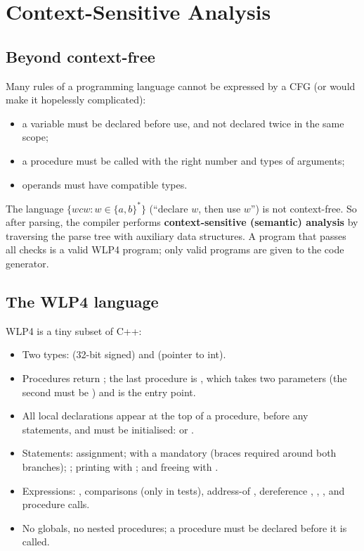 \chapter{Context-Sensitive Analysis}

\section{Beyond context-free}

Many rules of a programming language cannot be expressed by a CFG (or would make it
hopelessly complicated):
\begin{itemize}
  \item a variable must be declared before use, and not declared twice in the same scope;
  \item a procedure must be called with the right number and types of arguments;
  \item operands must have compatible types.
\end{itemize}
The language $\{ wcw : w\in\{a,b\}^*\}$ (``declare $w$, then use $w$'') is not context-free.
So after parsing, the compiler performs \textbf{context-sensitive (semantic) analysis} by
traversing the parse tree with auxiliary data structures. A program that passes all checks is
a valid WLP4 program; only valid programs are given to the code generator.

\section{The WLP4 language}

WLP4 is a tiny subset of C++:
\begin{itemize}
  \item Two types:  (32-bit signed) and  (pointer to int).
  \item Procedures return ; the last procedure is , which takes two
        parameters (the second must be ) and is the entry point.
  \item All local declarations appear at the top of a procedure, before any statements, and
        must be initialised:  or .
  \item Statements: assignment;  with a mandatory  (braces required
        around both branches); ; printing with ; and freeing
        with .
  \item Expressions: \code{+ - * / \%}, comparisons \code{== != < <= > >=} (only in tests),
        address-of \code{\&}, dereference \code{*}, , , and
        procedure calls.
  \item No globals, no nested procedures; a procedure must be declared before it is called.
\end{itemize}

